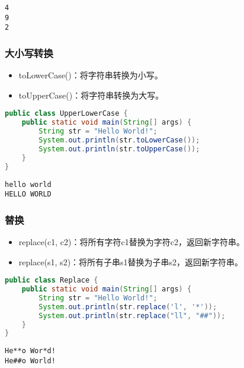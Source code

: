 \begin{tcolorbox}
	\begin{verbatim}
4
9
2
	\end{verbatim}
\end{tcolorbox}

\subsubsection{大小写转换}

\begin{itemize}
	\item toLowerCase()：将字符串转换为小写。
	\item toUpperCase()：将字符串转换为大写。
\end{itemize}


\begin{lstlisting}[language=Java]
public class UpperLowerCase {
	public static void main(String[] args) {
		String str = "Hello World!";
		System.out.println(str.toLowerCase());
		System.out.println(str.toUpperCase());
	}
}
\end{lstlisting}

\begin{tcolorbox}
	\begin{verbatim}
hello world
HELLO WORLD
	\end{verbatim}
\end{tcolorbox}

\subsubsection{替换}

\begin{itemize}
	\item replace(c1, c2)：将所有字符c1替换为字符c2，返回新字符串。
	\item replace(s1, s2)：将所有子串s1替换为子串s2，返回新字符串。
\end{itemize}


\begin{lstlisting}[language=Java]
public class Replace {
	public static void main(String[] args) {
		String str = "Hello World!";
		System.out.println(str.replace('l', '*'));
		System.out.println(str.replace("ll", "##"));
	}
}
\end{lstlisting}

\begin{tcolorbox}
	\begin{verbatim}
He**o Wor*d!
He##o World!
	\end{verbatim}
\end{tcolorbox}

